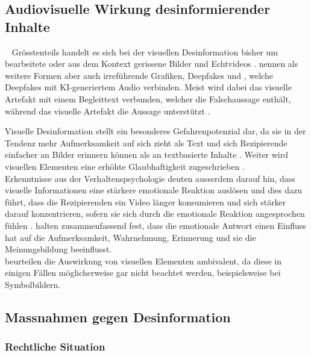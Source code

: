 \documentclass[12pt,a4paper]{article}        %
\begin{document}
\subsection{Audiovisuelle Wirkung desinformierender Inhalte}
~\label{theory_audiovisual_content}
Grösstenteils handelt es sich bei der visuellen Desinformation bisher um bearbeitete oder aus dem Kontext gerissene Bilder und Echtvideos \parencite[15]{bradshaw_industrialized_2021}. \textcite[3698]{weikmann_visual_2023} nennen als weitere Formen aber auch irreführende Grafiken, Deepfakes und , welche Deepfakes mit KI-generiertem Audio verbinden. Meist wird dabei das visuelle Artefakt mit einem Begleittext verbunden, welcher die Falschaussage enthält, während das visuelle Artefakt die Aussage unterstützt \parencite[3700]{weikmann_visual_2023}.

Visuelle Desinformation stellt ein besonderes Gefahrenpotenzial dar, da sie in der Tendenz mehr Aufmerksamkeit auf sich zieht als Text \parencites[3701]{weikmann_visual_2023} und sich Rezipierende einfacher an Bilder erinnern können als an textbasierte Inhalte \parencite{grady_neural_1998}. Weiter wird visuellen Elementen eine erhöhte Glaubhaftigkeit zugeschrieben \parencite[3703f]{weikmann_visual_2023}.\\
Erkenntnisse aus der Verhaltenspsychologie deuten ausserdem darauf hin, dass visuelle Informationen eine stärkere emotionale Reaktion auslösen \parencite[3703]{weikmann_visual_2023} und dies dazu führt, dass die Rezipierenden ein Video länger konsumieren und sich stärker darauf konzentrieren, sofern sie sich durch die emotionale Reaktion angesprochen fühlen \parencite[146]{teixeira_emotion-induced_2012}. \textcite[23]{zhou_effects_2005} halten zusammenfassend fest, dass die emotionale Antwort einen Einfluss hat auf die Aufmerksamkeit, Wahrnehmung, Erinnerung und sie die Meinungsbildung beeinflusst. \\
\textcite[501]{schaewitz_when_2020} beurteilen die Auswirkung von visuellen Elementen ambivalent, da diese in einigen Fällen möglicherweise gar nicht beachtet werden, beispielsweise bei Symbolbildern.

\subsection{Massnahmen gegen Desinformation}
\subsubsection{Rechtliche Situation}
\end{document}
